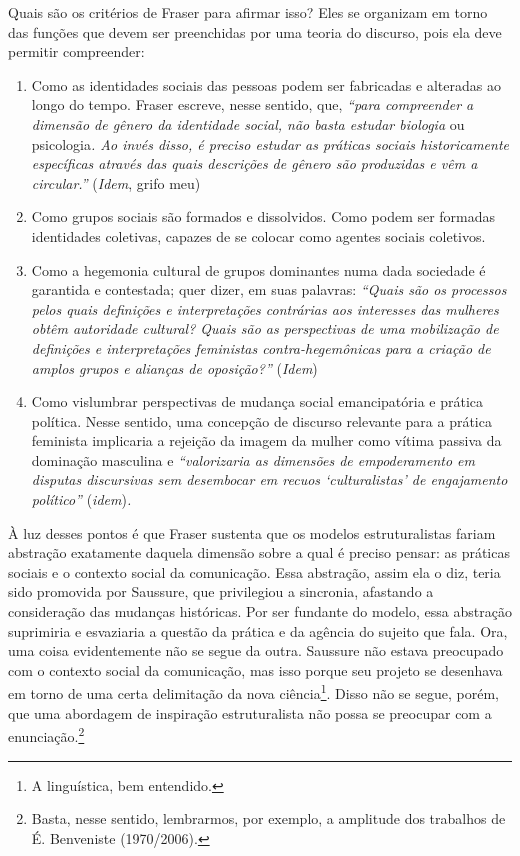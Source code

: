 Quais são os critérios de Fraser para afirmar isso? Eles se organizam em
torno das funções que devem ser preenchidas por uma teoria do discurso,
pois ela deve permitir compreender:

\begin{enumerate}
\def\labelenumi{\arabic{enumi})}
\item
Como as identidades sociais das pessoas podem ser fabricadas e
alteradas ao longo do tempo. Fraser escreve, nesse sentido, que,
\emph{``para compreender a dimensão de gênero da identidade social, não
basta estudar biologia} ou psicologia\emph{. Ao invés disso, é preciso
estudar as práticas sociais historicamente específicas através das quais
descrições de gênero são produzidas e vêm a circular.''} (\emph{Idem},
grifo meu)
\item
Como grupos sociais são formados e dissolvidos. Como podem ser
formadas identidades coletivas, capazes de se colocar como agentes
sociais coletivos.
\item
Como a hegemonia cultural de grupos dominantes numa dada sociedade é
garantida e contestada; quer dizer, em suas palavras: \emph{``Quais são
os processos pelos quais definições e interpretações contrárias aos
interesses das mulheres obtêm autoridade cultural? Quais são as
perspectivas de uma mobilização de definições e interpretações
feministas contra-hegemônicas para a criação de amplos grupos e alianças
de oposição?''} (\emph{Idem})
\item
Como vislumbrar perspectivas de mudança social emancipatória e
prática política. Nesse sentido, uma concepção de discurso relevante
para a prática feminista implicaria a rejeição da imagem da mulher como
vítima passiva da dominação masculina e \emph{``valorizaria as dimensões
de empoderamento em disputas discursivas sem desembocar em recuos
`culturalistas' de engajamento político''} (\emph{idem})\emph{.}
\end{enumerate}

À luz desses pontos é que Fraser sustenta que os modelos estruturalistas
fariam abstração exatamente daquela dimensão sobre a qual é preciso
pensar: as práticas sociais e o contexto social da comunicação. Essa
abstração, assim ela o diz, teria sido promovida por Saussure, que
privilegiou a sincronia, afastando a consideração das mudanças
históricas. Por ser fundante do modelo, essa abstração suprimiria e
esvaziaria a questão da prática e da agência do sujeito que fala. Ora,
uma coisa evidentemente não se segue da outra. Saussure não estava
preocupado com o contexto social da comunicação, mas isso porque seu
projeto se desenhava em torno de uma certa delimitação da nova
ciência\footnote{A linguística, bem entendido.}. Disso não se segue,
porém, que uma abordagem de inspiração estruturalista não possa se
preocupar com a enunciação.\footnote{Basta, nesse sentido, lembrarmos,
  por exemplo, a amplitude dos trabalhos de É. Benveniste (1970/2006).}

